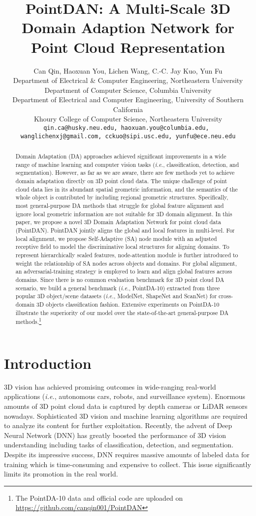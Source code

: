 \documentclass{article}
\title{PointDAN: A Multi-Scale 3D Domain Adaption Network for Point Cloud Representation}
\author{
    Can Qin\footnotemark[1], Haoxuan You\footnotemark[1], Lichen Wang, C.-C. Jay Kuo, Yun Fu \\
    Department of Electrical \& Computer Engineering, Northeastern University\\
    Department of Computer Science, Columbia University\\
    Department of Electrical and Computer Engineering, University of Southern California\\
    Khoury College of Computer Science, Northeastern University\\
    \texttt{qin.ca@husky.neu.edu, haoxuan.you@columbia.edu, }\\ \texttt{wanglichenxj@gmail.com, cckuo@sipi.usc.edu, yunfu@ece.neu.edu}\\
}
\newcommand*\ie{\textit{i.e.}}
\begin{document}
\maketitle

\begin{abstract}

Domain Adaptation (DA) approaches achieved significant improvements in a wide range of machine learning and computer vision tasks (\ie, classification, detection, and segmentation). However, as far as we are aware, there are few methods yet to achieve domain adaptation directly on 3D point cloud data. The unique challenge of point cloud data lies in its abundant spatial geometric information, and the semantics of the whole object is contributed by including regional geometric structures.  Specifically, most general-purpose DA methods that struggle for global feature alignment and ignore local geometric information are not suitable for 3D domain alignment. In this paper, we propose a novel 3D Domain Adaptation Network for point cloud data (PointDAN). PointDAN jointly aligns the global and local features in multi-level. For local alignment, we propose Self-Adaptive (SA) node module with an adjusted receptive field to model the discriminative local structures for aligning domains. To represent hierarchically scaled features, node-attention module is further introduced to weight the relationship of SA nodes across objects and domains. For global alignment, an adversarial-training strategy is employed to learn and align global features across domains. Since there is no common evaluation benchmark for 3D point cloud DA scenario, we build a general benchmark (\textit{i.e.}, PointDA-10) extracted from three popular 3D object/scene datasets (\textit{i.e.}, ModelNet, ShapeNet and ScanNet) for cross-domain 3D objects classification fashion. Extensive experiments on PointDA-10 illustrate the superiority of our model over the state-of-the-art general-purpose DA methods.\footnote{The PointDA-10 data and official code are uploaded on \url{https://github.com/canqin001/PointDAN}}
\end{abstract}

\renewcommand{\thefootnote}{\fnsymbol{footnote}}


\section{Introduction}\label{intro}
3D vision has achieved promising outcomes in wide-ranging real-world applications (\ie, autonomous cars, robots, and surveillance system). Enormous amounts of 3D point cloud data is captured by depth cameras or LiDAR sensors nowadays. Sophisticated 3D vision and machine learning algorithms are required to analyze its content for further exploitation. Recently, the advent of Deep Neural Network (DNN) has greatly boosted the performance of 3D vision understanding including tasks of classification, detection, and segmentation\cite{qi2017pointnet,feng2018gvcnn,  you2019pvrnet,zhou2018voxelnet}. Despite its impressive success, DNN requires massive amounts of labeled data for training which is time-consuming and expensive to collect. This issue significantly limits its promotion in the real world.
\end{document}
